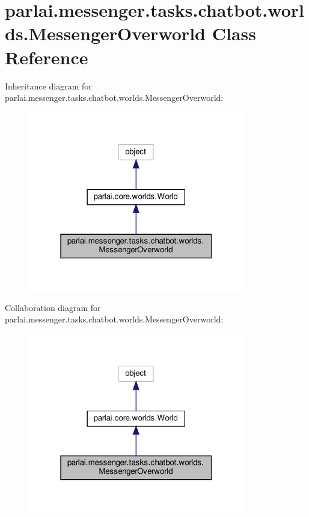 \hypertarget{classparlai_1_1messenger_1_1tasks_1_1chatbot_1_1worlds_1_1MessengerOverworld}{}\section{parlai.\+messenger.\+tasks.\+chatbot.\+worlds.\+Messenger\+Overworld Class Reference}
\label{classparlai_1_1messenger_1_1tasks_1_1chatbot_1_1worlds_1_1MessengerOverworld}


Inheritance diagram for parlai.\+messenger.\+tasks.\+chatbot.\+worlds.\+Messenger\+Overworld\+:
\nopagebreak
\begin{figure}[H]
\begin{center}
\leavevmode
\includegraphics[width=268pt]{classparlai_1_1messenger_1_1tasks_1_1chatbot_1_1worlds_1_1MessengerOverworld__inherit__graph}
\end{center}
\end{figure}


Collaboration diagram for parlai.\+messenger.\+tasks.\+chatbot.\+worlds.\+Messenger\+Overworld\+:
\nopagebreak
\begin{figure}[H]
\begin{center}
\leavevmode
\includegraphics[width=268pt]{classparlai_1_1messenger_1_1tasks_1_1chatbot_1_1worlds_1_1MessengerOverworld__coll__graph}
\end{center}
\end{figure}
